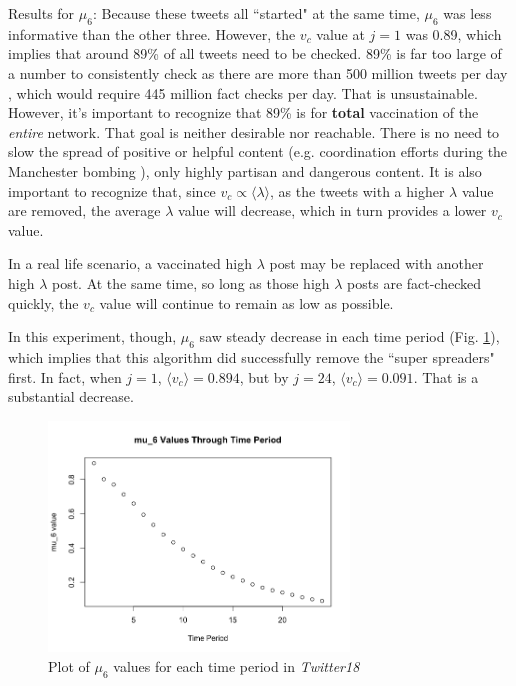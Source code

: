 \documentclass[preprint,review,12pt]{elsarticle}
\begin{document}
Results for $\mu_6$:
Because these tweets all ``started" at the same time, $\mu_6$ was less informative than the other three. However, the $v_c$ value at $j=1$ was 0.89, which implies that around 89\% of all tweets need to be checked. 89\% is far too large of a number to consistently check as there are more than 500 million tweets per day \cite{raffi2013tweets}, which would require 445 million fact checks per day. That is unsustainable. However, it's important to recognize that 89\% is for \textbf{total} vaccination of the \textit{entire} network. That goal is neither desirable nor reachable. There is no need to slow the spread of positive or helpful content (e.g. coordination efforts during the Manchester bombing \cite{mirbabaie2020breaking, eriksson2016facebook}), only highly partisan and dangerous content. It is also important to recognize that, since $v_c \propto \langle \lambda \rangle$, as the tweets with a higher $\lambda$ value are removed, the average $\lambda$ value will decrease, which in turn provides a lower $v_c$ value.

In a real life scenario, a vaccinated high $\lambda$ post may be replaced with another high $\lambda$ post. At the same time, so long as those high $\lambda$ posts are fact-checked quickly, the $v_c$ value will continue to remain as low as possible. 

In this experiment, though, $\mu_6$ saw steady decrease in each time period (Fig. \ref{fig:mu6 Twitter18}), which implies that this algorithm did successfully remove the ``super spreaders" first. In fact, when $j=1$, $\langle v_c \rangle = 0.894$, but by $j=24$, $\langle v_c \rangle = 0.091$. That is a substantial decrease.
\begin{figure}[h!]
    \centering
    \includegraphics[width=8cm]{mu6 graph.png}
    \caption{Plot of $\mu_6$ values for each time period in \textit{Twitter18}}
    \label{fig:mu6 Twitter18}
\end{figure}
 
\end{document}
